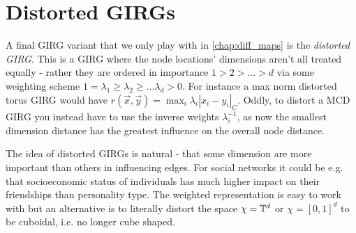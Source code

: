 \section{Distorted GIRGs}
\label{subsec:distorted_girgs}
A final GIRG variant that we only play with in \cref{chap:diff_maps} is the \textit{distorted GIRG}. This is a GIRG where the node locations' dimensions aren't all treated equally - rather they are ordered in importance $1 > 2 > ... > d$ via some weighting scheme $1=\lambda_1 \geq \lambda_2 \geq ... \lambda_d > 0$. For instance a max norm distorted torus GIRG would have $r(\vec{x}, \vec{y}) = \max_i \lambda_i |x_i - y_i|_C$. Oddly, to distort a MCD GIRG you instead have to use the inverse weights $\lambda_i^{-1}$, as now the smallest dimension distance has the greatest influence on the overall node distance.

The idea of distorted GIRGs is natural - that some dimension are more important than others in influencing edges. For social networks it could be e.g. that socioeconomic status of individuals has much higher impact on their friendships than personality type. The weighted representation is easy to work with but an alternative is to literally distort the space $\chi = \mathbb{T}^d$ or $\chi = [0,1]^d$ to be cuboidal, i.e. no longer cube shaped.







